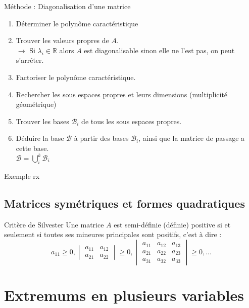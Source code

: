 \begin{bclogo}[logo=\bclampe,arrondi=0.1,ombre=true, couleur=yellow!60,couleurBord=yellow]{Méthode : Diagonalisation d'une matrice}
\begin{enumerate}
    \item Déterminer le polynôme caractéristique
    \item Trouver les valeurs propres de $A$.\\
    $\rightarrow$ Si $\lambda_i\in\mathbb{R}$ alors $A$ est diagonalisable sinon elle ne l'est pas, on peut s'arrêter.
    \item Factoriser le polynôme caractéristique.
    \item Rechercher les sous espaces propres et leurs dimensions (multiplicité géométrique)
    \item Trouver les bases $\mathscr{B}_i$ de tous les sous espaces propres.
    \item Déduire la base $\mathscr{B}$ à partir des bases $\mathscr{B}_i$,
    ainsi que la matrice de passage a cette base.\\
    $\mathscr{B} =\bigcup_{i}^{k}\mathscr{B}_i$
\end{enumerate}
\end{bclogo}
\begin{bclogo}[logo=\bccrayon,noborder=true,barre=snake]{Exemple}
rx
\end{bclogo}
\section{Matrices symétriques et formes quadratiques}
\begin{bclogo}[couleur=green!30,couleurBord=green,logo=\bccle ,ombre=true,arrondi=0.1]{Critère de Silvester}
Une matrice $A$ est semi-définie (définie) positive si et seulement si toutes ses mineures principales sont positifs, c'est à  dire :
$$a_{11}\ge 0, \begin{vmatrix} a_{11}&a_{12}\\ a_{21} & a_{22}\end{vmatrix}\ge 0,\begin{vmatrix}a_{11} & a_{12} & a_{13}\\ a_{21} & a_{22} & a_{23}\\ a_{31} & a_{32} & a_{33}\end{vmatrix}\ge 0, ...$$
\end{bclogo}
\chapter{Extremums en plusieurs variables}